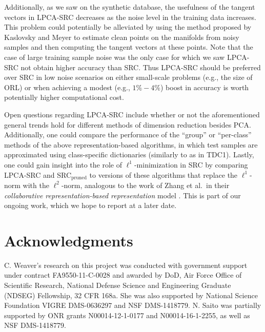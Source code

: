 \documentclass[review]{elsarticle}
\begin{document}
Additionally, as we saw on the synthetic database, the usefulness of the tangent vectors in LPCA-SRC decreases as the noise level in the training data increases. This problem could potentially be alleviated by using the method proposed by Kaslovsky and Meyer \cite{mey:tan} to estimate clean points on the manifolds from noisy samples and then computing the tangent vectors at these points. Note that the case of large training sample noise was the only case for which we saw LPCA-SRC not obtain higher accuracy than SRC. Thus LPCA-SRC should be preferred over SRC in low noise scenarios on either small-scale problems (e.g., the size of ORL) or when achieving a modest (e.g., $1\%-4\%$) boost in accuracy is worth potentially higher computational cost.



Open questions regarding LPCA-SRC include whether or not the aforementioned general trends hold for different methods of dimension reduction besides PCA. Additionally, one could compare the performance of the ``group'' or ``per-class'' methods of the above representation-based algorithms, in which test samples are approximated using class-specific dictionaries (similarly to as in TDC1). Lastly, one could gain insight into the role of $\ell^1$-minimization in SRC by comparing LPCA-SRC and SRC$_\mathrm{pruned}$ to versions of these algorithms that replace the $\ell^1$-norm with the $\ell^2$-norm, analogous to the work of Zhang et al.\ in their \emph{collaborative representation-based representation} model \cite{zha:crc2}. This is part of our ongoing work, which we hope to report at a later date. 



\section*{Acknowledgments}

C. Weaver's research on this project was conducted with government support under contract FA9550-11-C-0028 and awarded by DoD, Air Force Office of Scientific Research, National Defense Science and Engineering Graduate (NDSEG) Fellowship, 32 CFR 168a. She was also supported by National Science Foundation VIGRE DMS-0636297 and NSF DMS-1418779. N. Saito was partially supported by ONR grants N00014-12-1-0177 and N00014-16-1-2255, as well as NSF DMS-1418779.
  




\end{document}
